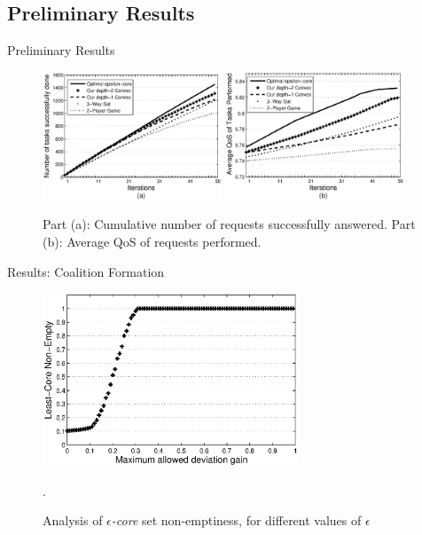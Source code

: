 \documentclass{beamer}
\begin{document}
\subsection{Preliminary Results}
\begin{frame}{Preliminary Results}

    \begin{figure}[!t]
    \centering
    \includegraphics[width=2.1in]{figures/task_done_opt.eps}
    \includegraphics[width=2.1in]{figures/task_qos_opt.eps}
    \caption{Part (a): Cumulative number of requests successfully
    answered. Part (b): Average QoS of requests performed.}
    \label{performanceall}
    \end{figure}

\end{frame}

\begin{frame}{Results: Coalition Formation}
    \begin{figure}[!t]
        \centering
        \includegraphics[width=3in]{figures/least_core.eps}
        \caption{Analysis of \emph{$\epsilon$-core} set non-emptiness, for different values of $\epsilon$}. \label{f_leastcore}
    \end{figure}
\end{frame}
\end{document}
